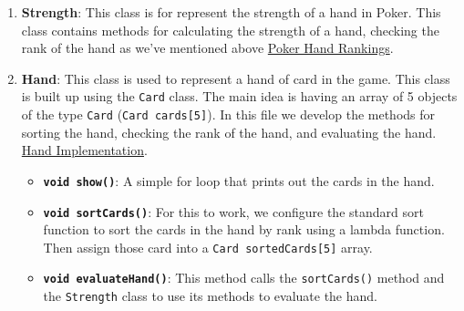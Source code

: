 \begin{enumerate}
    \item \textbf{Strength}: This class is for represent the strength of a hand in Poker. This class contains methods for calculating the strength of a hand, checking the rank of the hand as we've mentioned above \hyperref[subsubsec:poker-hand-rankings]{Poker Hand Rankings}.

    \item \textbf{Hand}: This class is used to represent a hand of card in the game. This class is built up using the \texttt{Card} class. The main idea is having an array of 5 objects of the type \texttt{Card} (\texttt{Card cards[5]}). In this file we develop the methods for sorting the hand, checking the rank of the hand, and evaluating the hand. \href{https://github.com}{Hand Implementation}.
    \begin{itemize}
        \item \textbf{\texttt{void show()}}: A simple for loop that prints out the cards in the hand.
        \item \textbf{\texttt{void sortCards()}}: For this to work, we configure the standard sort function to sort the cards in the hand by rank using a lambda function. Then assign those card into a \texttt{Card sortedCards[5]} array.
        \item \textbf{\texttt{void evaluateHand()}}: This method calls the \texttt{sortCards()} method and the \texttt{Strength} class to use its methods to evaluate the hand.
    \end{itemize}
\end{enumerate}
